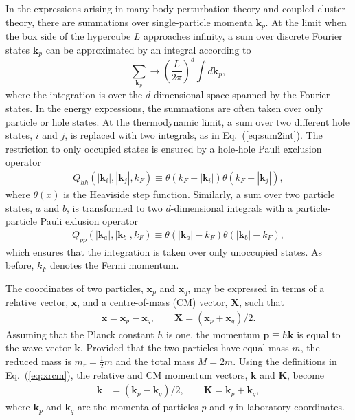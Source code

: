 \documentclass[a4paper,12pt]{report}
\begin{document}
In the expressions arising in many-body perturbation theory and 
coupled-cluster theory, there are summations over single-particle 
momenta $\mathbf{k}_{p}$. At the limit when the box side of the 
hypercube $L$ approaches infinity, a sum over discrete Fourier 
states $\mathbf{k}_{p}$ can be approximated by an integral according to
\begin{equation}
  \sum_{\mathbf{k}_{p}} \longrightarrow 
  \left( \frac{L}{2\pi }\right)^{d}\int d\mathbf{k}_{p},
   \label{eq:sum2int}
\end{equation}
where the integration is over the $d$-dimensional space spanned by the 
Fourier states. In the energy expressions, the summations are often taken 
over only particle or hole states. At the thermodynamic limit, a sum over 
two different hole states, $i$ and $j$, is replaced with two integrals, 
as in Eq.~(\ref{eq:sum2int}). The restriction to only occupied states is 
ensured by a hole-hole Pauli exclusion operator
\begin{align}
  Q_{hh}(|\mathbf{k}_{i}|, |\mathbf{k}_{j}|, k_{F}) \equiv \theta(k_{F}-|\mathbf{k}_{i}|)\theta(k_{F}-|\mathbf{k}_{j}|),
\end{align}
where $\theta(x)$ is the Heaviside step function. Similarly, a sum over
two particle states, $a$ and $b$, is transformed to two $d$-dimensional 
integrals with a particle-particle Pauli exlusion operator
\begin{align}
  Q_{pp}(|\mathbf{k}_{a}|, |\mathbf{k}_{b}|, k_{F})\equiv \theta(|\mathbf{k}_{a}|-k_{F})\theta(|\mathbf{k}_{b}|-k_{F}),
\end{align}
which ensures that the integration is taken over only unoccupied
states. As before, $k_{F}$ denotes the Fermi momentum.


The coordinates of two particles, $\mathbf{x}_{p}$ and 
$\mathbf{x}_{q}$, may be expressed in terms of a relative 
vector, $\mathbf{x}$, and a centre-of-mass (CM) vector, 
$\mathbf{X}$, such that
\begin{align}
  \mathbf{x} = \mathbf{x}_{p}-\mathbf{x}_{q}, 
  \qquad \mathbf{X} = (\mathbf{x}_{p}+\mathbf{x}_{q})/2.
  \label{eq:xrcm}
\end{align}
Assuming that the Planck constant $\hbar $ is one, the momentum
$\mathbf{p} \equiv \hbar \mathbf{k}$ is equal to the wave
vector $\mathbf{k}$. Provided that the two particles have 
equal mass $m$, the reduced mass is $m_{r} = \frac{1}{2}m$
and the total mass $M = 2m$. Using the definitions in 
Eq.~(\ref{eq:xrcm}), the relative and CM momentum vectors,
$\mathbf{k}$ and $\mathbf{K}$, become
\begin{align}
  \mathbf{k} &= (\mathbf{k}_{p}-\mathbf{k}_{q})/2, 
\qquad \mathbf{K} = \mathbf{k}_{p} + \mathbf{k}_{q}, 
  \label{eq:lab2rcm}
\end{align}
where $\mathbf{k}_{p}$ and $\mathbf{k}_{q}$ are the momenta
of particles $p$ and $q$ in laboratory coordinates.  
\end{document}
